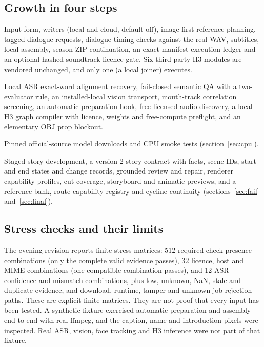 \documentclass[11pt,a4paper]{article}
\begin{document}
\subsection{Growth in four steps}
\begin{description}[leftmargin=0.6cm]
\item[20 October, base release.] Input form, writers (local and cloud, default off), image-first reference planning, tagged dialogue requests, dialogue-timing checks against the real WAV, subtitles, local assembly, season ZIP continuation, an exact-manifest execution ledger and an optional hashed soundtrack licence gate. Six third-party H3 modules are vendored unchanged, and only one (a local joiner) executes.
\item[20 October, evening.] Local ASR exact-word alignment recovery, fail-closed semantic QA with a two-evaluator rule, an installed-local vision transport, mouth-track correlation screening, an automatic-preparation hook, free licensed audio discovery, a local H3 graph compiler with licence, weights and free-compute preflight, and an elementary OBJ prop blockout.
\item[20 October, portable runtime.] Pinned official-source model downloads and CPU smoke tests (section~\ref{sec:cpu}).
\item[25 October.] Staged story development, a version-2 story contract with facts, scene IDs, start and end states and change records, grounded review and repair, renderer capability profiles, cut coverage, storyboard and animatic previews, and a reference bank, route capability registry and eyeline continuity (sections~\ref{sec:fail} and~\ref{sec:final}).
\end{description}

\subsection{Stress checks and their limits}
The evening revision reports finite stress matrices: 512 required-check presence combinations (only the complete valid evidence passes), 32 licence, host and MIME combinations (one compatible combination passes), and 12 ASR confidence and mismatch combinations, plus low, unknown, NaN, stale and duplicate evidence, and download, runtime, tamper and unknown-job rejection paths. These are explicit finite matrices. They are not proof that every input has been tested. A synthetic fixture exercised automatic preparation and assembly end to end with real ffmpeg, and the caption, name and introduction pixels were inspected. Real ASR, vision, face tracking and H3 inference were not part of that fixture.
\end{document}
